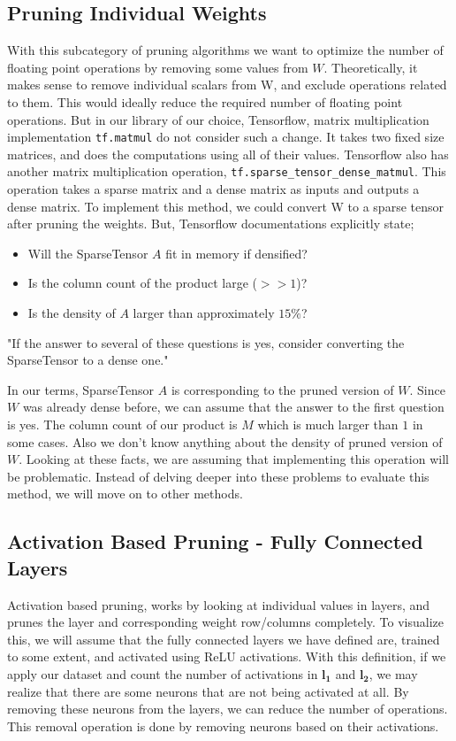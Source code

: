 \subsection{Pruning Individual Weights}
With this subcategory of pruning algorithms we want to optimize the number of floating point operations by removing some values from $W$. Theoretically, it makes sense to remove individual scalars from W, and exclude operations related to them. This would ideally reduce the required number of floating point operations. But in our library of our choice, Tensorflow, matrix multiplication implementation \texttt{tf.matmul} do not consider such a change. It takes two fixed size matrices, and does the computations using all of their values. Tensorflow also has another matrix multiplication operation, \texttt{tf.sparse\_tensor\_dense\_matmul}. This operation takes a sparse matrix and a dense matrix as inputs and outputs a dense matrix. To implement this method, we could convert W to a sparse tensor after pruning the weights. But, Tensorflow documentations explicitly state;
\begin{displayquote}
\begin{itemize}
\item Will the SparseTensor $A$ fit in memory if densified?
\item Is the column count of the product large ($>> 1$)?
\item Is the density of $A$ larger than approximately $15\%$?
\end{itemize}
"If the answer to several of these questions is yes, consider converting the SparseTensor to a dense one."
\end{displayquote}
In our terms, SparseTensor $A$ is corresponding to the pruned version of $W$. Since $W$ was already dense before, we can assume that the answer to the first question is yes. The column count of our product is $M$ which is much larger than $1$ in some cases. Also we don't know anything about the density of pruned version of $W$. Looking at these facts, we are assuming that implementing this operation will be problematic. Instead of delving deeper into these problems to evaluate this method, we will move on to other methods.
\subsection{Activation Based Pruning - Fully Connected Layers} \label{sec:activation-based-pruning-convolution}
Activation based pruning, works by looking at individual values in layers, and prunes the layer and corresponding weight row/columns completely. To visualize this, we will assume that the fully connected layers we have defined are, trained to some extent, and activated using ReLU activations. With this definition, if we apply our dataset and count the number of activations in $\mathbf{l_1}$ and $\mathbf{l_2}$, we may realize that there are some neurons that are not being activated at all. By removing these neurons from the layers, we can reduce the number of operations. This removal operation is done by removing neurons based on their activations. 
